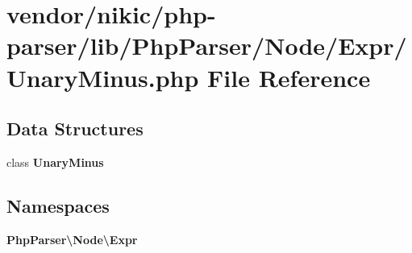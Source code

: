 \section{vendor/nikic/php-\/parser/lib/\+Php\+Parser/\+Node/\+Expr/\+Unary\+Minus.php File Reference}
\label{_unary_minus_8php}
\subsection*{Data Structures}
\begin{DoxyCompactItemize}
\item 
class {\bf Unary\+Minus}
\end{DoxyCompactItemize}
\subsection*{Namespaces}
\begin{DoxyCompactItemize}
\item 
 {\bf Php\+Parser\textbackslash{}\+Node\textbackslash{}\+Expr}
\end{DoxyCompactItemize}
